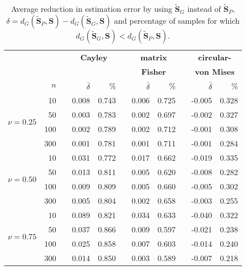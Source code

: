 \begin{table}[h]
\caption{Average reduction in estimation error by using $\widetilde{\bm{S}}_{G}$ instead of $\widetilde{\bm S}_P$, $\delta=d_G(\widetilde{\bm S}_P,\bm S) - d_G(\widetilde{\bm S}_{G},\bm S)$ and percentage of samples for which $d_G(\widetilde{\bm S}_{G},\bm S) < d_G(\widetilde{\bm S}_P,\bm S)$.  \label{tab:percL1}}
\begin{center}
\begin{tabular}{rrcrrcrrcrr}
  \hline
  & &&\multicolumn{2}{c}{\textbf{Cayley}} & &\multicolumn{2}{c}{\textbf{matrix} } &&\multicolumn{2}{c}{\textbf{circular-}}\\
    && &\multicolumn{2}{c}{} & &\multicolumn{2}{c}{\textbf{Fisher}} & &\multicolumn{2}{c}{\textbf{von Mises}}\\ 
\rule[2mm]{0mm}{3mm} 
  &  $n$ && $\bar{\delta}$ & \% & & $\bar{\delta}$ & \% & & $\bar{\delta}$ & \% \\ 
  \hline \hline
  \multirow{4}{*}{$\nu=0.25$} 
  &   10 & & 0.008 & 0.743 & &  0.006 & 0.725 & & -0.005 & 0.328 \\ 
  &   50 & &  0.003 & 0.783 & &  0.002 & 0.697 & & -0.002 & 0.327 \\ 
  &  100 & &  0.002 & 0.789 & & 0.002 & 0.712 & & -0.001 & 0.308 \\ 
  &  300 & & 0.001 & 0.781 & & 0.001 & 0.711 & & -0.001 & 0.284 \\ \hline
  \multirow{4}{*}{$\nu=0.50$} 
   &   10 & & 0.031 & 0.772 & &  0.017 & 0.662 & &  -0.019 & 0.335 \\ 
   &   50 & & 0.013 & 0.811 & & 0.005 & 0.620 & &-0.008 & 0.282 \\ 
   &  100 & & 0.009 & 0.809 & &  0.005 & 0.660 & &  -0.005 & 0.302 \\ 
   &  300 & & 0.005 & 0.804 & &  0.002 & 0.658 & & -0.003 & 0.255 \\ \hline
   \multirow{4}{*}{$\nu=0.75$} 
  &  10 & & 0.089 & 0.821 & & 0.034 & 0.633 & & -0.040 & 0.322 \\ 
  &   50 & & 0.037 & 0.866 & & 0.009 & 0.597 & & -0.021 & 0.238 \\ 
  &  100 & &  0.025 & 0.858 & & 0.007 & 0.603 & & -0.014 & 0.240 \\ 
  &  300 & &  0.014 & 0.850 &&  0.003 & 0.589 & & -0.007 & 0.218 \\ 
   \hline
\end{tabular}
\end{center}
\end{table}


